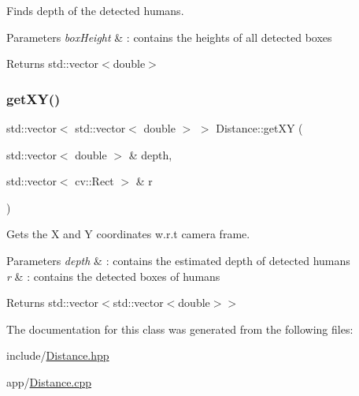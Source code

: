 Finds depth of the detected humans. 


\begin{DoxyParams}{Parameters}
{\em box\+Height} & \+: contains the heights of all detected boxes \\
\hline
\end{DoxyParams}
\begin{DoxyReturn}{Returns}
std\+::vector$<$double$>$ 
\end{DoxyReturn}
\mbox{\label{classDistance_a55adbc3ca34cb0c56237c84259305f5e}} 
\subsubsection{\texorpdfstring{get\+X\+Y()}{getXY()}}
{\footnotesize\ttfamily std\+::vector$<$ std\+::vector$<$ double $>$ $>$ Distance\+::get\+XY (\begin{DoxyParamCaption}\item[{std\+::vector$<$ double $>$ \&}]{depth,  }\item[{std\+::vector$<$ cv\+::\+Rect $>$ \&}]{r }\end{DoxyParamCaption})}



Gets the X and Y coordinates w.\+r.\+t camera frame. 


\begin{DoxyParams}{Parameters}
{\em depth} & \+: contains the estimated depth of detected humans \\
\hline
{\em r} & \+: contains the detected boxes of humans \\
\hline
\end{DoxyParams}
\begin{DoxyReturn}{Returns}
std\+::vector$<$std\+::vector$<$double$>$$>$ 
\end{DoxyReturn}


The documentation for this class was generated from the following files\+:\begin{DoxyCompactItemize}
\item 
include/\hyperlink{Distance_8hpp}{Distance.\+hpp}\item 
app/\hyperlink{Distance_8cpp}{Distance.\+cpp}\end{DoxyCompactItemize}

